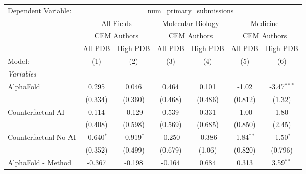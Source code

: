 \begingroup
\centering
\begin{tabular}{lcccccc}
   \tabularnewline \midrule \midrule
   Dependent Variable: & \multicolumn{6}{c}{num\_primary\_submissions}\\
 & \multicolumn{2}{c}{All Fields} & \multicolumn{2}{c}{Molecular Biology} & \multicolumn{2}{c}{Medicine} \\
\cmidrule(lr){2-3} \cmidrule(lr){4-5} \cmidrule(lr){6-7}
 & \multicolumn{2}{c}{CEM Authors} & \multicolumn{2}{c}{CEM Authors} & \multicolumn{2}{c}{CEM Authors} \\
\cmidrule(lr){2-3} \cmidrule(lr){4-5} \cmidrule(lr){6-7}
 & \multicolumn{1}{c}{All PDB} & \multicolumn{1}{c}{High PDB} & \multicolumn{1}{c}{All PDB} & \multicolumn{1}{c}{High PDB} & \multicolumn{1}{c}{All PDB} & \multicolumn{1}{c}{High PDB} \\
\cmidrule(lr){2-2} \cmidrule(lr){3-3} \cmidrule(lr){4-4} \cmidrule(lr){5-5} \cmidrule(lr){6-6} \cmidrule(lr){7-7}
   Model:                                                     & (1)          & (2)           & (3)          & (4)         & (5)           & (6)\\  
   \midrule
   \emph{Variables}\\
   AlphaFold                                                  & 0.295        & 0.046         & 0.464        & 0.101       & -1.02         & -3.47$^{***}$\\   
                                                              & (0.334)      & (0.360)       & (0.468)      & (0.486)     & (0.812)       & (1.32)\\   
   Counterfactual AI                                          & 0.114        & -0.129        & 0.539        & 0.331       & -1.00         & 1.80\\   
                                                              & (0.408)      & (0.598)       & (0.569)      & (0.685)     & (0.850)       & (2.45)\\   
   Counterfactual No AI                                       & -0.640$^{*}$ & -0.919$^{*}$  & -0.250       & -0.386      & -1.84$^{**}$  & -1.50$^{*}$\\   
                                                              & (0.352)      & (0.499)       & (0.679)      & (1.06)      & (0.820)       & (0.796)\\   
   AlphaFold - Method                                         & -0.367       & -0.198        & -0.164       & 0.684       & 0.313         & 3.59$^{**}$\\   

\end{tabular}
